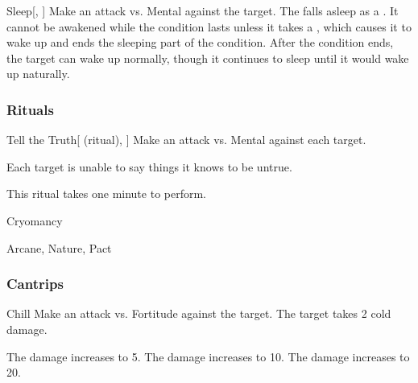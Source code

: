 \lowercase{\hypertarget{spell:Sleep}{}}\label{spell:Sleep}
\begin{freeability}[Rank 8]{\hypertarget{spell:Sleep}{Sleep}}[, ]
Make an attack vs. Mental against the target.
\hit The falls asleep as a .
It cannot be awakened while the condition lasts unless it takes a , which causes it to wake up and ends the sleeping part of the condition.
After the condition ends, the target can wake up normally, though it continues to sleep until it would wake up naturally.
\end{freeability}
\vspace{0.25em}



\subsubsection{Rituals}


\lowercase{\hypertarget{spell:Tell the Truth}{}}\label{spell:Tell the Truth}
\begin{attuneability}[Rank 4]{\hypertarget{spell:Tell the Truth}{Tell the Truth}}[ (ritual), ]
Make an attack vs. Mental against each target.

\hit Each target is unable to say things it knows to be untrue.

This ritual takes one minute to perform.
\end{attuneability}
\vspace{0.25em}


\newpage
\begin{spellsection}{Cryomancy}

\begin{spellheader}
\end{spellheader}


 Arcane, Nature, Pact

\subsubsection{Cantrips}


\begin{freeability}{Chill}
Make an attack vs. Fortitude against the target.
\hit The target takes 2 cold damage.

\rankline
{} The damage increases to 5.
 The damage increases to 10.
 The damage increases to 20.
\end{freeability}

\end{spellsection}


